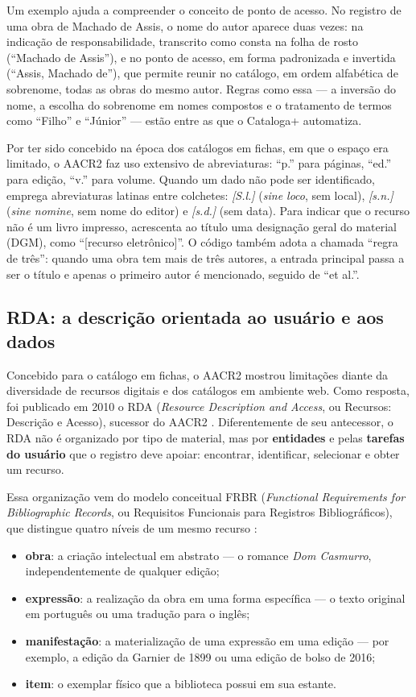 Um exemplo ajuda a compreender o conceito de ponto de acesso. No registro de uma obra de Machado de Assis, o nome do autor aparece duas vezes: na indicação de responsabilidade, transcrito como consta na folha de rosto (``Machado de Assis''), e no ponto de acesso, em forma padronizada e invertida (``Assis, Machado de''), que permite reunir no catálogo, em ordem alfabética de sobrenome, todas as obras do mesmo autor. Regras como essa --- a inversão do nome, a escolha do sobrenome em nomes compostos e o tratamento de termos como ``Filho'' e ``Júnior'' --- estão entre as que o Cataloga+ automatiza.

Por ter sido concebido na época dos catálogos em fichas, em que o espaço era limitado, o AACR2 faz uso extensivo de abreviaturas: ``p.'' para páginas, ``ed.'' para edição, ``v.'' para volume. Quando um dado não pode ser identificado, emprega abreviaturas latinas entre colchetes: \textit{[S.l.]} (\textit{sine loco}, sem local), \textit{[s.n.]} (\textit{sine nomine}, sem nome do editor) e \textit{[s.d.]} (sem data). Para indicar que o recurso não é um livro impresso, acrescenta ao título uma designação geral do material (DGM), como ``[recurso eletrônico]''. O código também adota a chamada ``regra de três'': quando uma obra tem mais de três autores, a entrada principal passa a ser o título e apenas o primeiro autor é mencionado, seguido de ``et al.''.

\subsection{RDA: a descrição orientada ao usuário e aos dados}
\label{subsec:rda}

Concebido para o catálogo em fichas, o AACR2 mostrou limitações diante da diversidade de recursos digitais e dos catálogos em ambiente web. Como resposta, foi publicado em 2010 o RDA (\textit{Resource Description and Access}, ou Recursos: Descrição e Acesso), sucessor do AACR2 \cite{rda2010}. Diferentemente de seu antecessor, o RDA não é organizado por tipo de material, mas por \textbf{entidades} e pelas \textbf{tarefas do usuário} que o registro deve apoiar: encontrar, identificar, selecionar e obter um recurso.

Essa organização vem do modelo conceitual FRBR (\textit{Functional Requirements for Bibliographic Records}, ou Requisitos Funcionais para Registros Bibliográficos), que distingue quatro níveis de um mesmo recurso \cite{ifla1998frbr}:

\begin{itemize}
    \item \textbf{obra}: a criação intelectual em abstrato --- o romance \textit{Dom Casmurro}, independentemente de qualquer edição;
    \item \textbf{expressão}: a realização da obra em uma forma específica --- o texto original em português ou uma tradução para o inglês;
    \item \textbf{manifestação}: a materialização de uma expressão em uma edição --- por exemplo, a edição da Garnier de 1899 ou uma edição de bolso de 2016;
    \item \textbf{item}: o exemplar físico que a biblioteca possui em sua estante.
\end{itemize}

